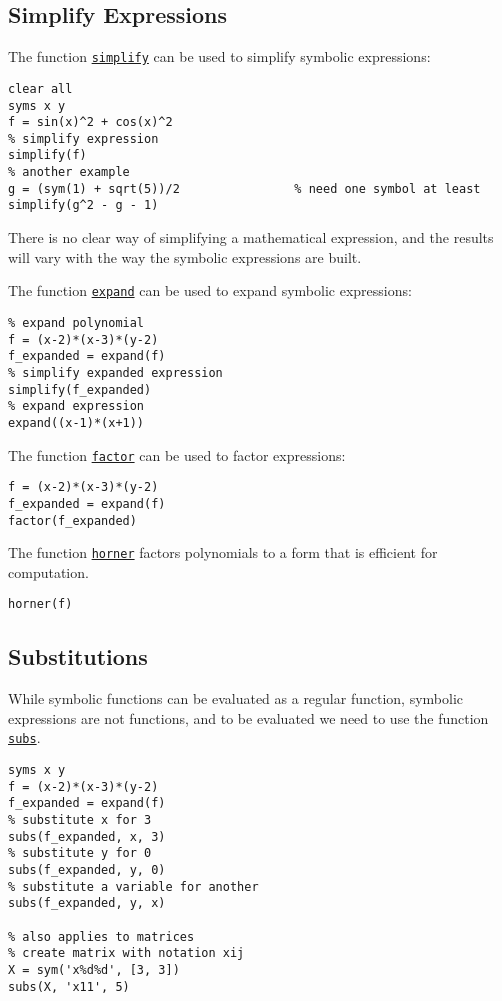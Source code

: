 \documentclass[12pt, a4paper]{article}
\begin{document}
\subsection{Simplify Expressions}
\label{sec:org53f26ca}
The function \href{https://www.mathworks.com/help/symbolic/simplify.html?s\_tid=doc\_ta}{\texttt{simplify}} can be used to simplify symbolic expressions:
\lstset{language=matlab,label= ,caption= ,captionpos=b,firstnumber=1,numbers=left,style=Matlab-editor}
\begin{lstlisting}
clear all
syms x y
f = sin(x)^2 + cos(x)^2
% simplify expression
simplify(f)
% another example
g = (sym(1) + sqrt(5))/2                % need one symbol at least
simplify(g^2 - g - 1)
\end{lstlisting}
There is no clear way of simplifying a mathematical expression, and the results will vary with the way the symbolic expressions are built.

The function \href{https://www.mathworks.com/help/symbolic/expand.html?s\_tid=doc\_ta}{\texttt{expand}} can be used to expand symbolic expressions:
\lstset{language=matlab,label= ,caption= ,captionpos=b,firstnumber=1,numbers=left,style=Matlab-editor}
\begin{lstlisting}
% expand polynomial
f = (x-2)*(x-3)*(y-2)
f_expanded = expand(f)
% simplify expanded expression
simplify(f_expanded)
% expand expression
expand((x-1)*(x+1))
\end{lstlisting}

The function \href{https://www.mathworks.com/help/symbolic/factor.html?s\_tid=doc\_ta}{\texttt{factor}} can be used to factor expressions:
\lstset{language=matlab,label= ,caption= ,captionpos=b,firstnumber=1,numbers=left,style=Matlab-editor}
\begin{lstlisting}
f = (x-2)*(x-3)*(y-2)
f_expanded = expand(f)
factor(f_expanded)
\end{lstlisting}
The function \href{https://www.mathworks.com/help/symbolic/horner.html?s\_tid=doc\_ta}{\texttt{horner}} factors polynomials to a form that is efficient for computation.
\lstset{language=matlab,label= ,caption= ,captionpos=b,firstnumber=1,numbers=left,style=Matlab-editor}
\begin{lstlisting}
horner(f)
\end{lstlisting}
\subsection{Substitutions}
\label{sec:org7cd7a50}
While symbolic functions can be evaluated as a regular function, symbolic expressions are not functions, and to be evaluated we need to use the function \href{https://www.mathworks.com/help/symbolic/subs.html?s\_tid=doc\_ta}{\texttt{subs}}.
\lstset{language=matlab,label= ,caption= ,captionpos=b,firstnumber=1,numbers=left,style=Matlab-editor}
\begin{lstlisting}
syms x y
f = (x-2)*(x-3)*(y-2)
f_expanded = expand(f)
% substitute x for 3
subs(f_expanded, x, 3)
% substitute y for 0
subs(f_expanded, y, 0)
% substitute a variable for another
subs(f_expanded, y, x)

% also applies to matrices
% create matrix with notation xij
X = sym('x%d%d', [3, 3])
subs(X, 'x11', 5)
\end{lstlisting}
\end{document}
